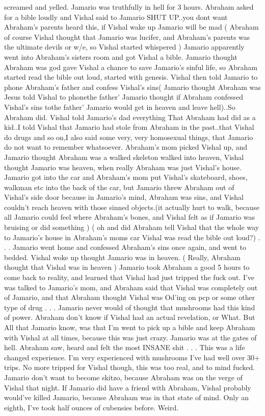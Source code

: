 \documentclass[12pt]{book}
\begin{document}
screamed and yelled. Jamario was truthfully in hell for 3 hours. Abraham asked for a bible loudly and Vishal said to Jamario SHUT UP..you dont want Abraham's parents heard this, if Vishal wake up Jamario will be mad ( Abraham of course Vishal thought that Jamario was lucifer, and Abraham's parents was the ultimate devils or w/e, so Vishal started whispered ) Jamario apparently went into Abraham's sisters room and got Vishal a bible. Jamario thought Abraham was god gave Vishal a chance to save Jamario's sinful life, so Abraham started read the bible out loud, started with genesis. Vishal then told Jamario to phone Abraham's father and confess Vishal's sins( Jamario thought Abraham was Jesus told Vishal to phonethe father' Jamario thought if Abraham confessed Vishal's sins tothe father' Jamario would get in heaven and leave hell)..So Abraham did. Vishal told Jamario's dad everything That Abraham had did as a kid..I told Vishal that Jamario had stole from Abraham in the past..that Vishal do drugs and so on,I also said some very, very homosexual things, that Jamario do not want to remember whatsoever. Abraham's mom picked Vishal up, and Jamario thought Abraham was a walked skeleton walked into heaven, Vishal thought Jamario was heaven, when really Abraham was just Vishal's house. Jamario got into the car and Abraham's mom put Vishal's skateboard, shoes, walkman etc into the back of the car, but Jamario threw Abraham out of Vishal's side door because in Jamario's mind, Abraham was sins, and Vishal couldn't reach heaven with those sinned objects.(it actually hurt to walk, because all Jamario could feel where Abraham's bones, and Vishal felt as if Jamario was bruising or did something ) ( oh and did Abraham tell Vishal that the whole way to Jamario's house in Abraham's moms car Vishal was read the bible out loud?) . . .  Jamario went home and confessed Abraham's sins once again, and went to bedded. Vishal woke up thought Jamario was in heaven. ( Really, Abraham thought that Vishal was in heaven ) Jamario took Abraham a good 5 hours to come back to reality, and learned that Vishal had just tripped the fuck out. I've was talked to Jamario's mom, and Abraham said that Vishal was completely out of Jamario, and that Abraham thought Vishal was Od'ing on pcp or some other type of drug . . .  Jamario never would of thought that mushrooms had this kind of power. Abraham don't know if Vishal had an actual revelation, or What. But All that Jamario know, was that I'm went to pick up a bible and keep Abraham with Vishal at all times, because this was just crazy. Jamario was at the gates of hell. Abraham saw, heard and felt the most INSANE shit . . .  This was a life changed experience. I'm very experienced with mushrooms I've had well over 30+ trips. No more tripped for Vishal though, this was too real, and to mind fucked. Jamario don't want to become skitzo, because Abraham was on the verge of Vishal that night. If Jamario did have a friend with Abraham, Vishal probably would've killed Jamario, because Abraham was in that state of mind. Only an eighth, I've took half ounces of cubensies before. Weird.
\end{document}
